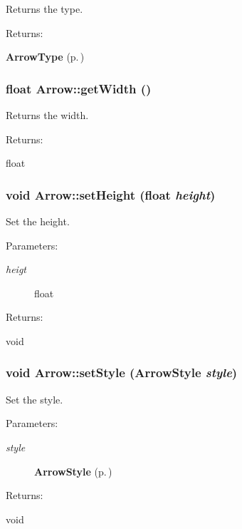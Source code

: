 Returns the type. \begin{Desc}
\item[Returns: ]\par
{\bf Arrow\-Type} {\rm (p.\,\pageref{classArrow_s6})} \end{Desc}
\subsubsection{\setlength{\rightskip}{0pt plus 5cm}float Arrow::get\-Width ()\hspace{0.3cm}{\tt  [inline]}}\label{classArrow_a10}


Returns the width. \begin{Desc}
\item[Returns: ]\par
float \end{Desc}
\subsubsection{\setlength{\rightskip}{0pt plus 5cm}void Arrow::set\-Height (float {\em height})\hspace{0.3cm}{\tt  [inline]}}\label{classArrow_a6}


Set the height. \begin{Desc}
\item[Parameters: ]\par
\begin{description}
\item[{\em 
heigt}]float \end{description}
\end{Desc}
\begin{Desc}
\item[Returns: ]\par
void \end{Desc}
\subsubsection{\setlength{\rightskip}{0pt plus 5cm}void Arrow::set\-Style ({\bf Arrow\-Style} {\em style})\hspace{0.3cm}{\tt  [inline]}}\label{classArrow_a3}


Set the style. \begin{Desc}
\item[Parameters: ]\par
\begin{description}
\item[{\em 
style}]{\bf Arrow\-Style} {\rm (p.\,\pageref{classArrow_s7})} \end{description}
\end{Desc}
\begin{Desc}
\item[Returns: ]\par
void \end{Desc}
